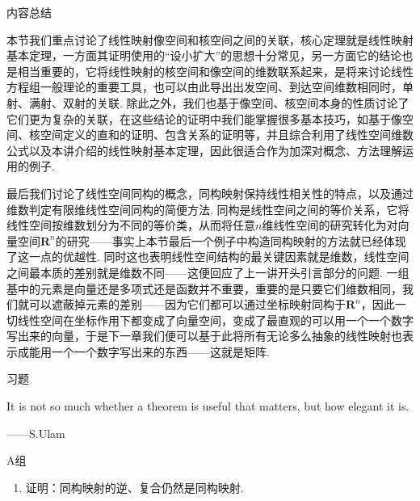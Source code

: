 \vspace{2ex}
\centerline{\heiti \Large 内容总结}

本节我们重点讨论了线性映射像空间和核空间之间的关联，核心定理就是线性映射基本定理，一方面其证明使用的``设小扩大''的思想十分常见，另一方面它的结论也是相当重要的，它将线性映射的核空间和像空间的维数联系起来，是将来讨论线性方程组一般理论的重要工具，也可以由此导出出发空间、到达空间维数相同时，单射、满射、双射的关联. 除此之外，我们也基于像空间、核空间本身的性质讨论了它们更为复杂的关联，在这些结论的证明中我们能掌握很多基本技巧，如基于像空间、核空间定义的直和的证明、包含关系的证明等，并且综合利用了线性空间维数公式以及本讲介绍的线性映射基本定理，因此很适合作为加深对概念、方法理解运用的例子.

最后我们讨论了线性空间同构的概念，同构映射保持线性相关性的特点，以及通过维数判定有限维线性空间同构的简便方法. 同构是线性空间之间的等价关系，它将线性空间按维数划分为不同的等价类，从而将任意$n$维线性空间的研究转化为对向量空间$\mathbf{R}^n$的研究——事实上本节最后一个例子中构造同构映射的方法就已经体现了这一点的优越性. 同时这也表明线性空间结构的最关键因素就是维数，线性空间之间最本质的差别就是维数不同——这便回应了上一讲开头引言部分的问题. 一组基中的元素是向量还是多项式还是函数并不重要，重要的是只要它们维数相同，我们就可以遮蔽掉元素的差别——因为它们都可以通过坐标映射同构于$\mathbf{R}^n$，因此一切线性空间在坐标作用下都变成了向量空间，变成了最直观的可以用一个一个数字写出来的向量，于是下一章我们便可以基于此将所有无论多么抽象的线性映射也表示成能用一个一个数字写出来的东西——这就是矩阵.

\vspace{2ex}
\centerline{\heiti \Large 习题}

\vspace{2ex}
It is not so much whether a theorem is useful that matters, but how elegant it is.
\begin{flushright}
    ——S.Ulam
\end{flushright}

\centerline{\heiti A组}
\begin{enumerate}
    \item 证明：同构映射的逆、复合仍然是同构映射.
\end{enumerate}

